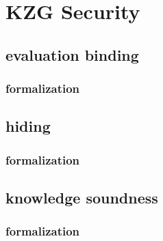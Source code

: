 \chapter{KZG Security}\label{chapter:security}

\section{evaluation binding}

\subsection{formalization}

\section{hiding}

\subsection{formalization}

\section{knowledge soundness}

\subsection{formalization}